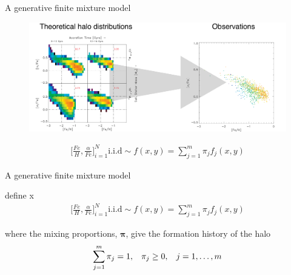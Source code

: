 \documentclass{beamer}
\newcommand{\afe}{\frac{\alpha}{Fe}}
\newcommand{\feh}{\frac{Fe}{H}}
\newcommand{\eqn}[1]{\begin{align*}
#1
\end{align*}}
\newcommand{\vect}[1]{\boldsymbol{\mathbf{#1}}}
\newcommand{\vp}{\vect{\pi}}
\begin{document}
\begin{frame}{A generative finite mixture model}
	
	
		
	\begin{figure}
			\begin{center}
				\includegraphics[width=\textwidth]{denstoobs.pdf}
			\end{center}
	\end{figure}
	
	\eqn{
		\Bigg[\feh,\afe\Bigg]_{i=1}^{N} \text{i.i.d} \sim f(x,y) = \sum^m_{j=1} \pi_j f_j(x,y)
	}	
	
\end{frame}









\begin{frame}{A generative finite mixture model}
	
	define x
	\eqn{
		\Bigg[\feh,\afe\Bigg]_{i=1}^{N} \text{i.i.d} \sim f(x,y) = \sum^m_{j=1} \pi_j f_j(x,y)
	}
	
	
	where the mixing proportions, $\vp$, give the formation history of the halo \eqn{
		\sum^m_{j=1} \pi_j = 1,  \hspace{3mm}    \pi_j \geq 0, \hspace{3mm} j=1,\ldots,m
	 }
	

	
\end{frame}
\end{document}
